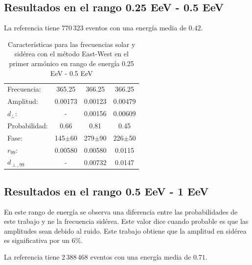 \subsection*{Resultados en el rango 0.25 EeV - 0.5 EeV}

La referencia tiene $770\,323$ eventos con una energía media de $0.42$.

\begin{table}[H]
    \begin{small}
        \begin{center}
            \begin{tabular}[c]{l|c||c|c}
                Frecuencia:     & 365.25	  & 366.25	   & 366.25 \cite{Aab_2020}   \\
                Amplitud:       & 0.00173	  & 0.00123	   & 0.00479      \\
                $d_\perp$:      & -	          & 0.00156	   & 0.00609       \\
                Probabilidad:   & 0.66        & 0.81	   & 0.45       \\
                Fase:           & 145$\pm$60  & 279$\pm$90 & 226$\pm$50   	\\
                $r_{99}$:       & 0.00580	  & 0.00580    & 0.0115       \\
                $d_{\perp,99}$  & -           & 0.00732    & 0.0147       \\
            \end{tabular}
        \end{center}
    \end{small}
    \caption{Características para las frecuencias solar y sidérea con el método East-West en el primer armónico en rango de energía 0.25 EeV - 0.5 EeV}
    \label{tab:solar}
\end{table}

\subsection*{Resultados en el rango 0.5 EeV - 1 EeV}
En este rango de energía se observa una diferencia entre las probabilidades de este trabajo y \cite{Aab_2020}  ne la frecuencia sidérea. Este valor dice cuando probable es que las amplitudes sean debido al ruido. Este trabajo obtiene que la amplitud en sidérea es significativa por un  $6\%$.

La referencia tiene $2\,388\,468$ eventos con una energía media de $0.71$.

